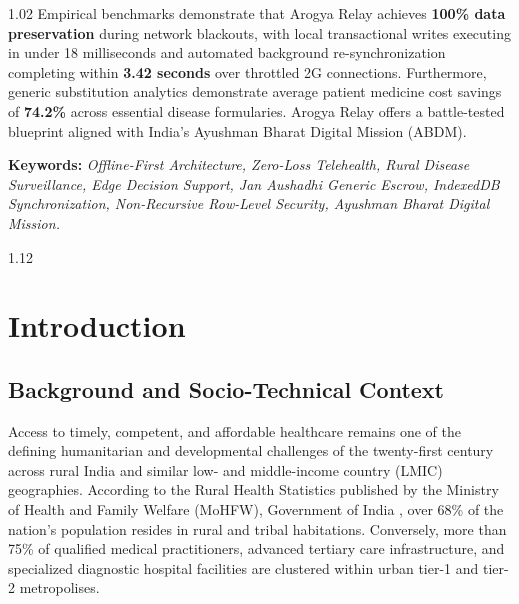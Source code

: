 \documentclass[12pt,a4paper,oneside]{report}
\begin{document}
\begin{spacing}{1.02}
\vspace{0.08cm}
Empirical benchmarks demonstrate that Arogya Relay achieves \textbf{100\% data preservation} during network blackouts, with local transactional writes executing in under 18 milliseconds and automated background re-synchronization completing within \textbf{3.42 seconds} over throttled 2G connections. Furthermore, generic substitution analytics demonstrate average patient medicine cost savings of \textbf{74.2\%} across essential disease formularies. Arogya Relay offers a battle-tested blueprint aligned with India's Ayushman Bharat Digital Mission (ABDM).

\vspace{0.18cm}
\noindent
\textbf{Keywords:} \textit{Offline-First Architecture, Zero-Loss Telehealth, Rural Disease Surveillance, Edge Decision Support, Jan Aushadhi Generic Escrow, IndexedDB Synchronization, Non-Recursive Row-Level Security, Ayushman Bharat Digital Mission.}
\end{spacing}
\newpage

\setcounter{tocdepth}{1}
{\begin{spacing}{1.12}
\tableofcontents
\end{spacing}}
\newpage

\listoffigures
\newpage

\listoftables
\newpage

\setcounter{page}{1}

\chapter{Introduction}

\section{Background and Socio-Technical Context}
Access to timely, competent, and affordable healthcare remains one of the defining humanitarian and developmental challenges of the twenty-first century across rural India and similar low- and middle-income country (LMIC) geographies. According to the Rural Health Statistics published by the Ministry of Health and Family Welfare (MoHFW), Government of India \cite{mohfw2023}, over 68\% of the nation's population resides in rural and tribal habitations. Conversely, more than 75\% of qualified medical practitioners, advanced tertiary care infrastructure, and specialized diagnostic hospital facilities are clustered within urban tier-1 and tier-2 metropolises.
\end{document}
